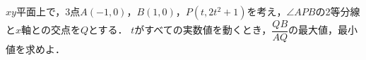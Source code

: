 \documentclass[../../main.tex]{subfiles}
\begin{document}
$xy$平面上で，3点$A(-1,0)$，$B(1,0)$，$P(t,2t^2+1)$を考え，$\angle APB$の2等分線と$x$軸との交点を$Q$とする．
$t$がすべての実数値を動くとき，$\displaystyle\dfrac{QB}{AQ}$の最大値，最小値を求めよ．
\end{document}
